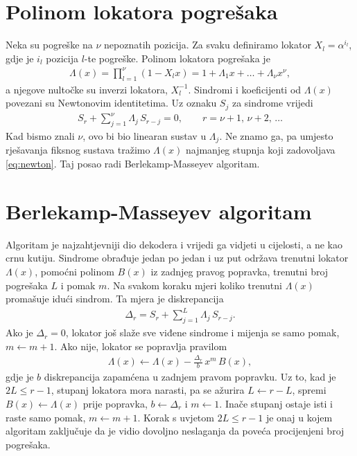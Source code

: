 \documentclass{mathos}
\begin{document}
\section{Polinom lokatora pogrešaka}

Neka su pogreške na $\nu$ nepoznatih pozicija. Za svaku definiramo lokator $X_l = \alpha^{i_l}$, gdje je $i_l$ pozicija $l$-te pogreške. Polinom lokatora pogrešaka je
\begin{align}\label{eq:lokator}
    \Lambda(x) = \prod_{l=1}^{\nu} (1 - X_l x) = 1 + \Lambda_1 x + \dots + \Lambda_\nu x^\nu,
\end{align}
a njegove nultočke su inverzi lokatora, $X_l^{-1}$. Sindromi i koeficijenti od $\Lambda(x)$ povezani su Newtonovim identitetima. Uz oznaku $S_j$ za sindrome vrijedi
\begin{align}\label{eq:newton}
    S_r + \sum_{j=1}^{\nu} \Lambda_j\, S_{r-j} = 0, \qquad r = \nu+1,\, \nu+2,\, \dots
\end{align}
Kad bismo znali $\nu$, ovo bi bio linearan sustav u $\Lambda_j$. Ne znamo ga, pa umjesto rješavanja fiksnog sustava tražimo $\Lambda(x)$ najmanjeg stupnja koji zadovoljava \eqref{eq:newton}. Taj posao radi Berlekamp-Masseyev algoritam.

\section{Berlekamp-Masseyev algoritam}\label{bm}

Algoritam je najzahtjevniji dio dekodera i vrijedi ga vidjeti u cijelosti, a ne kao crnu kutiju. Sindrome obrađuje jedan po jedan i uz put održava trenutni lokator $\Lambda(x)$, pomoćni polinom $B(x)$ iz zadnjeg pravog popravka, trenutni broj pogrešaka $L$ i pomak $m$. Na svakom koraku mjeri koliko trenutni $\Lambda(x)$ promašuje idući sindrom. Ta mjera je diskrepancija
\begin{align}\label{eq:disc}
    \Delta_r = S_r + \sum_{j=1}^{L} \Lambda_j\, S_{r-j}.
\end{align}
Ako je $\Delta_r = 0$, lokator još slaže sve viđene sindrome i mijenja se samo pomak, $m \leftarrow m+1$. Ako nije, lokator se popravlja pravilom
\begin{align}\label{eq:update}
    \Lambda(x) \leftarrow \Lambda(x) - \frac{\Delta_r}{b}\, x^m\, B(x),
\end{align}
gdje je $b$ diskrepancija zapamćena u zadnjem pravom popravku. Uz to, kad je $2L \le r-1$, stupanj lokatora mora narasti, pa se ažurira $L \leftarrow r - L$, spremi $B(x) \leftarrow \Lambda(x)$ prije popravka, $b \leftarrow \Delta_r$ i $m \leftarrow 1$. Inače stupanj ostaje isti i raste samo pomak, $m \leftarrow m+1$. Korak s uvjetom $2L \le r-1$ je onaj u kojem algoritam zaključuje da je vidio dovoljno neslaganja da poveća procijenjeni broj pogrešaka.
\end{document}

